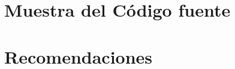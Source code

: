 \newpage
\section{Muestra del Código fuente}



\newpage
\section{Recomendaciones}


\newpage


%
%
